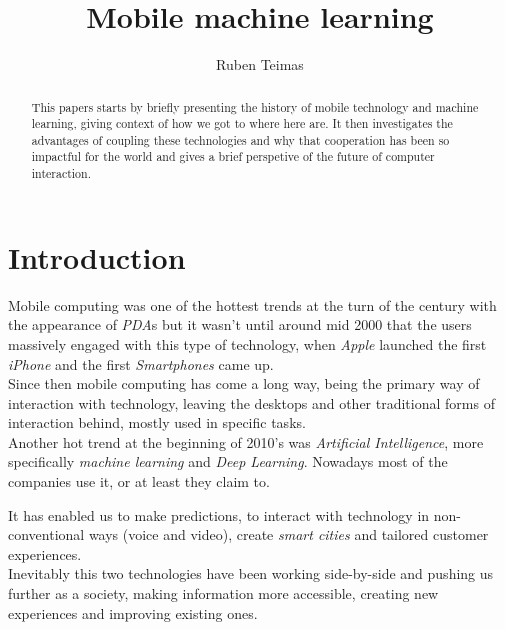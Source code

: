 \documentclass{llncs}
\begin{document}
\title{%
Mobile machine learning}

\author{%
Ruben Teimas}


\date{}


\maketitle{}

\begin{abstract}
This papers starts by briefly presenting the history of mobile technology and machine learning, giving context of how we got to where here are. It then investigates the advantages of coupling these technologies and why that cooperation has been so impactful for the world and gives a brief perspetive of the future of computer interaction.
\end{abstract}


\section{Introduction}

Mobile computing was one of the hottest trends at the turn of the century with the appearance of \emph{PDA}s but it wasn't until around mid 2000 that the users massively engaged with this type of technology, when \emph{Apple} launched the first \emph{iPhone} and the first \emph{Smartphones} came up.\\

Since then mobile computing has come a long way, being the primary way of interaction with technology, leaving the desktops and other traditional forms of interaction behind, mostly used in specific tasks.\\

Another hot trend at the beginning of 2010's was \emph{Artificial Intelligence}, more specifically \emph{machine learning} and \emph{Deep Learning}. Nowadays most of the companies use it, or at least they claim to. 

It has enabled us to make predictions, to interact with technology in non-conventional ways (voice and video), create \emph{smart cities} and tailored customer experiences.\\

Inevitably this two technologies have been  working side-by-side and pushing us further as a society, making information more accessible, creating new experiences and improving existing ones.
\end{document}
